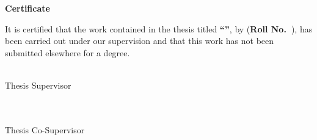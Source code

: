 \thispagestyle{plain}
\begin{center}
  {\huge\bfseries Certificate\par}
\end{center}
\vspace{1.5em}

It is certified that the work contained in the thesis titled
\textbf{``\ThesisTitle''}, by \textbf{\ThesisAuthor}
(\textbf{Roll No.\ \ThesisRollNumber}), has been carried out under our
supervision and that this work has not been submitted elsewhere for a degree.

\vfill
\noindent
\begin{minipage}[t]{0.46\textwidth}
\raggedright
\textbf{\ThesisSupervisor}\\
Thesis Supervisor\\
\ThesisDepartment\\
\ThesisInstitute
\end{minipage}
\hfill
\begin{minipage}[t]{0.46\textwidth}
\raggedleft
\textbf{\ThesisCoSupervisor}\\
Thesis Co-Supervisor\\
\ThesisDepartment\\
\ThesisInstitute
\end{minipage}

\vspace{2cm}
\noindent\ThesisSubmissionDate
